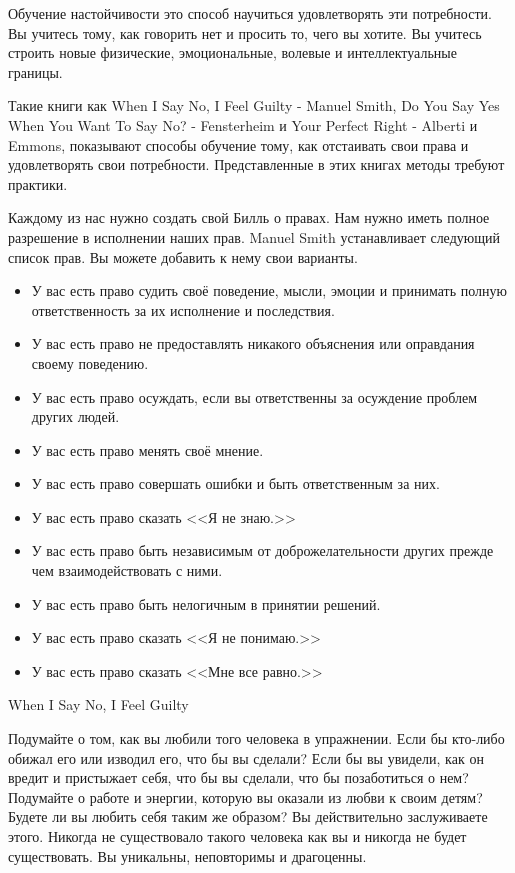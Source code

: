 \documentclass[10pt, fleqn]{article}
\begin{document}
Обучение настойчивости это способ научиться удовлетворять эти потребности. Вы учитесь тому, как говорить нет и просить то, чего вы хотите. Вы учитесь строить новые физические, эмоциональные, волевые и интеллектуальные границы.

Такие книги как When I Say No, I Feel Guilty - Manuel Smith,
Do You Say Yes When You Want To Say No? - Fensterheim и Your Perfect Right - Alberti и Emmons, показывают способы обучение тому, как отстаивать свои права и удовлетворять свои потребности. Представленные в этих книгах методы требуют практики.

Каждому из нас нужно создать свой Билль о правах. Нам нужно иметь полное разрешение в исполнении наших прав. Manuel Smith устанавливает следующий список прав. Вы можете добавить к нему свои варианты.

\begin{itemize}
\item У вас есть право судить своё поведение, мысли, эмоции и принимать полную ответственность за их исполнение и последствия.
\item У вас есть право не предоставлять никакого объяснения или оправдания своему поведению.
\item У вас есть право осуждать, если вы ответственны за осуждение проблем других людей.
\item У вас есть право менять своё мнение.
\item У вас есть право совершать ошибки и быть ответственным за них.
\item У вас есть право сказать <<Я не знаю.>>
\item У вас есть право быть независимым от доброжелательности других прежде чем взаимодействовать с ними.
\item У вас есть право быть нелогичным в принятии решений.
\item У вас есть право сказать <<Я не понимаю.>>
\item У вас есть право сказать <<Мне все равно.>>
\end{itemize}

When I Say No, I Feel Guilty



Подумайте о том, как вы любили того человека в упражнении. Если бы кто-либо обижал его или изводил его, что бы вы сделали? Если бы вы увидели, как он вредит и пристыжает себя, что бы вы сделали, что бы позаботиться о нем? Подумайте о работе и энергии, которую вы оказали из любви к своим детям? Будете ли вы любить себя таким же образом? Вы действительно заслуживаете этого. Никогда не существовало такого человека как вы и никогда не будет существовать. Вы уникальны, неповторимы и драгоценны.
\end{document}
